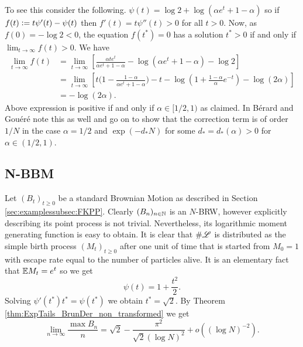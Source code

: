 To see this consider the following. $\psi(t) = \log 2 + \log (\alpha e^t + 1 - \alpha)$ so if $f(t) \vcentcolon= t \psi'(t) - \psi(t)$ then $f'(t) = t \psi''(t) > 0$ for all $t > 0$. Now, as $f(0) = -\log 2 < 0$, the equation $f(t^*) = 0$ has a solution $t^* > 0$ if and only if $\lim_{t \to \infty} f(t) > 0$. We have
\begin{align}
\lim\limits_{t \to \infty} f(t) &= \lim\limits_{t \to \infty} \left[\frac{\alpha t e^t}{\alpha e^t + 1 - \alpha} - \log(\alpha e^t + 1 - \alpha) - \log 2 \right] \\
								&= \lim\limits_{t \to \infty} \left[ t \big( 1 - \frac{1 - \alpha}{\alpha e^t + 1 - \alpha}\big) - t - \log (1 + \frac{1-\alpha}{\alpha} e^{-t}) - \log(2 \alpha) \right] \\
								&= - \log(2\alpha). 
\end{align} 
Above expression is positive if and only if $\alpha \in [1/2, 1)$ as claimed. In \cite{exp_tails} Bérard and Gouéré note this as well and go on to show that the correction term is of order $1/N$ in the case $\alpha = 1/2$ and $\exp(-d_* N)$ for some $d_* = d_*(\alpha) > 0$ for $\alpha \in (1/2, 1)$. 

\subsection{N-BBM}
Let $(B_t)_{t \geq 0}$ be a standard Brownian Motion as described in Section \ref{sec:examplessubsec:FKPP}. Clearly $(B_n)_{n \in \mathbb{N}}$ is an $N$-BRW, however explicitly describing its point process is not trivial. Nevertheless, its logarithmic moment generating function is easy to obtain. It is clear that $\# \mathscr{L}$ is distributed as the simple birth process $(M_t)_{t \geq 0}$ after one unit of time that is started from $M_0 = 1$ with escape rate equal to the number of particles alive. It is an elementary fact that $\mathbb{E} M_t = e^t$ so we get
\begin{equation}\nonumber
\psi(t) = 1 + \frac{t^2}{2}. 
\end{equation}
Solving $\psi'(t^*) t^* = \psi(t^*)$ we obtain $t^* = \sqrt{2}$. By Theorem \ref{thm:ExpTails_BrunDer_non_transformed} we get
\begin{equation}\nonumber
\lim\limits_{n \to \infty} \frac{\max B_n}{n} = \sqrt{2} - \frac{\pi^2}{\sqrt{2}(\log N)^2} + o((\log N)^{-2}). 
\end{equation}




